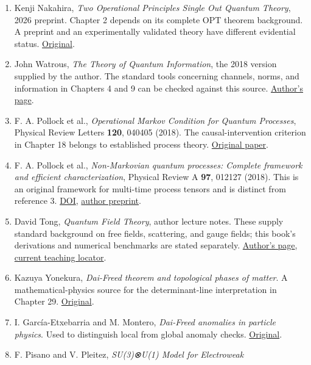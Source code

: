 \documentclass[
  11pt,
  oneside]{book}
\providecommand{\tightlist}{%
  \setlength{\itemsep}{0pt}\setlength{\parskip}{0pt}}
\begin{document}
\begin{enumerate}
\def\labelenumi{\arabic{enumi}.}
\tightlist
\item
  Kenji Nakahira, \emph{Two Operational Principles Single Out Quantum
  Theory}, 2026 preprint. Chapter 2 depends on its complete OPT theorem
  background. A preprint and an experimentally validated theory have
  different evidential status.
  \href{https://arxiv.org/abs/2605.23217}{Original}.
\item
  John Watrous, \emph{The Theory of Quantum Information}, the 2018
  version supplied by the author. The standard tools concerning
  channels, norms, and information in Chapters 4 and 9 can be checked
  against this source.
  \href{https://cs.uwaterloo.ca/~watrous/TQI/}{Author's page}.
\item
  F. A. Pollock et al., \emph{Operational Markov Condition for Quantum
  Processes}, Physical Review Letters \textbf{120}, 040405 (2018). The
  causal-intervention criterion in Chapter 18 belongs to established
  process theory.
  \href{https://doi.org/10.1103/PhysRevLett.120.040405}{Original paper}.
\item
  F. A. Pollock et al., \emph{Non-Markovian quantum processes: Complete
  framework and efficient characterization}, Physical Review A
  \textbf{97}, 012127 (2018). This is an original framework for
  multi-time process tensors and is distinct from reference 3.
  \href{https://doi.org/10.1103/PhysRevA.97.012127}{DOI},
  \href{https://arxiv.org/abs/1512.00589}{author preprint}.
\item
  David Tong, \emph{Quantum Field Theory}, author lecture notes. These
  supply standard background on free fields, scattering, and gauge
  fields; this book's derivations and numerical benchmarks are stated
  separately.
  \href{https://www.damtp.cam.ac.uk/user/tong/qft.htm}{Author's page},
  \href{https://davidtong.org/teaching/quantum-field-theory/}{current
  teaching locator}.
\item
  Kazuya Yonekura, \emph{Dai-Freed theorem and topological phases of
  matter}. A mathematical-physics source for the determinant-line
  interpretation in Chapter 29.
  \href{https://arxiv.org/abs/1607.01873}{Original}.
\item
  I. García-Etxebarria and M. Montero, \emph{Dai-Freed anomalies in
  particle physics}. Used to distinguish local from global anomaly
  checks. \href{https://arxiv.org/abs/1808.00009}{Original}.
\item
  F. Pisano and V. Pleitez, \emph{SU(3)⊗U(1) Model for Electroweak
}
\end{enumerate}
\end{document}
